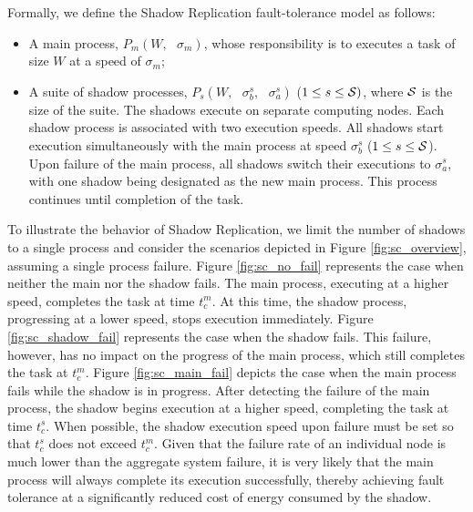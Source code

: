 Formally, we define the Shadow Replication fault-tolerance model as follows:
\begin{itemize}
\item A main process, $P_m(W,\text{ }\sigma_m)$, whose responsibility is to executes a task of size $W$ at a speed of $\sigma_m$;
\item A suite of shadow processes, $P_{s}(W,\text{ }\sigma_b^s, \text{ }\sigma_a^s)$ ($1 \le s \le \cal S)$, where $\cal S$ is the size of the suite. 
The shadows execute on separate computing nodes. Each shadow process is associated with two execution speeds. All shadows start execution simultaneously with the main process at speed $\sigma_b^s$ ($1 \le s \le \cal S$). Upon failure of the main process, all shadows switch their executions to $\sigma_a^s$, with one shadow being designated as the new main process. This process continues until completion of the task.
\end{itemize}

To illustrate the behavior of Shadow Replication, we limit the number of shadows to a single process and consider the scenarios depicted in Figure \ref{fig:sc_overview}, assuming a single process failure. Figure \ref{fig:sc_no_fail} represents the case when neither the main nor the shadow fails. The main process, executing
at a higher speed, completes the task at time $t_c^m$. At this time, the shadow process, progressing at a lower speed, stops execution immediately. Figure \ref{fig:sc_shadow_fail} represents the case when the shadow fails. This failure, however, has no impact on the progress of the main process, which still completes the task at $t_c^m$. Figure \ref{fig:sc_main_fail} depicts the case when the main process fails while the shadow is in progress. After detecting the failure of the main process, the shadow begins execution at a higher speed, completing the task at time $t_c^s$. When possible, the shadow execution speed upon failure must be set so that $t_c^s$ does not exceed $t_c^m$. Given that the failure rate of an individual node is much lower than
the aggregate system failure, it is very likely that the main process
will always complete its execution successfully, thereby achieving fault tolerance at a significantly reduced cost of energy consumed by the shadow. %

